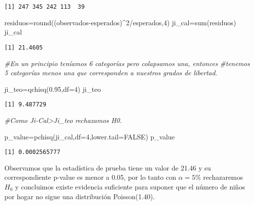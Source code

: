 \documentclass[
  a4paper,
  oneside,
  openany]{book}
\newenvironment{Shaded}{\begin{snugshade}}{\end{snugshade}}
\newcommand{\AttributeTok}[1]{\textcolor[rgb]{0.77,0.63,0.00}{#1}}
\newcommand{\CommentTok}[1]{\textcolor[rgb]{0.56,0.35,0.01}{\textit{#1}}}
\newcommand{\ConstantTok}[1]{\textcolor[rgb]{0.00,0.00,0.00}{#1}}
\newcommand{\DecValTok}[1]{\textcolor[rgb]{0.00,0.00,0.81}{#1}}
\newcommand{\FloatTok}[1]{\textcolor[rgb]{0.00,0.00,0.81}{#1}}
\newcommand{\FunctionTok}[1]{\textcolor[rgb]{0.00,0.00,0.00}{#1}}
\newcommand{\NormalTok}[1]{#1}
\newcommand{\OtherTok}[1]{\textcolor[rgb]{0.56,0.35,0.01}{#1}}
\newcommand{\SpecialCharTok}[1]{\textcolor[rgb]{0.00,0.00,0.00}{#1}}
\begin{document}
\begin{verbatim}
[1] 247 345 242 113  39
\end{verbatim}

\begin{Shaded}
\begin{Highlighting}[]
\NormalTok{residuos}\OtherTok{=}\FunctionTok{round}\NormalTok{((observados}\SpecialCharTok{{-}}\NormalTok{esperados)}\SpecialCharTok{\^{}}\DecValTok{2}\SpecialCharTok{/}\NormalTok{esperados,}\DecValTok{4}\NormalTok{)}
\NormalTok{ji\_cal}\OtherTok{=}\FunctionTok{sum}\NormalTok{(residuos)}
\NormalTok{ji\_cal}
\end{Highlighting}
\end{Shaded}

\begin{verbatim}
[1] 21.4605
\end{verbatim}

\begin{Shaded}
\begin{Highlighting}[]
\CommentTok{\#En un principio teníamos 6 categorías pero colapsamos una, entonces }
\CommentTok{\#tenemos 5 categorías menos una que corresponden a nuestros grados de libertad.}

\NormalTok{ji\_teo}\OtherTok{=}\FunctionTok{qchisq}\NormalTok{(}\FloatTok{0.95}\NormalTok{,}\AttributeTok{df=}\DecValTok{4}\NormalTok{)}
\NormalTok{ji\_teo}
\end{Highlighting}
\end{Shaded}

\begin{verbatim}
[1] 9.487729
\end{verbatim}

\begin{Shaded}
\begin{Highlighting}[]
\CommentTok{\#Como Ji{-}Cal\textgreater{}Ji\_teo rechazamos H0.}

\NormalTok{p\_value}\OtherTok{=}\FunctionTok{pchisq}\NormalTok{(ji\_cal,}\AttributeTok{df=}\DecValTok{4}\NormalTok{,}\AttributeTok{lower.tail=}\ConstantTok{FALSE}\NormalTok{)}
\NormalTok{p\_value}
\end{Highlighting}
\end{Shaded}

\begin{verbatim}
[1] 0.0002565777
\end{verbatim}

Observamos que la estadística de prueba tiene un valor de 21.46 y su correspondiente p-value es menor a 0.05, por lo tanto con \(\alpha=5\%\) rechazaremos \(H_0\) y concluimos existe evidencia suficiente para suponer que el número de niños por hogar no sigue una distribución Poisson(1.40).
\end{document}
